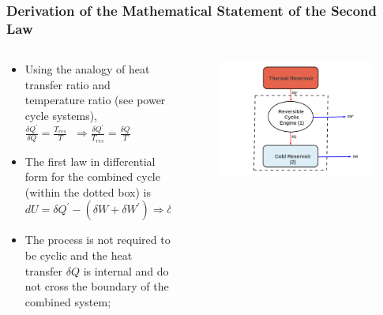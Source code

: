 \documentclass[10pt,compress]{beamer}
\begin{document}
\begin{frame}
 \frametitle{Derivation of the Mathematical Statement of the Second Law}
 \begin{columns}

  \begin{column}[c]{0.5\linewidth}
   \begin{itemize}
    \item <1-> Using the analogy of heat transfer ratio and temperature ratio (see power cycle systems), \\
                $\displaystyle\frac{\delta Q^{\prime}}{\delta Q} = \displaystyle\frac{T_{res}}{T} \;\; \Longrightarrow \displaystyle\frac{\delta Q^{\prime}}{T_{res}} = \displaystyle\frac{\delta Q}{T}$
  \item <2-> The first law in differential form for the combined cycle (within the dotted box) is \\
                $dU= \delta Q^{\prime} - \left(\delta W + \delta W^{\prime}\right) \Longrightarrow \delta W + \delta W^{\prime} = \delta Q^{\prime} - dU$
  \item <3-> The process is not required to be cyclic and the heat transfer $\delta Q$ is internal and do not cross the boundary of the combined system;
   \end{itemize}


  \end{column}

  \begin{column}[c]{0.5\linewidth}
   \begin{figure}%
    \begin{center}
     \includegraphics[width=1.1\columnwidth,clip]{./Pics/2ndLaw_Schem2}
    \end{center}
   \end{figure} 
  \end{column}
 \end{columns}


 \normalsize
    
\end{frame}
\end{document}
